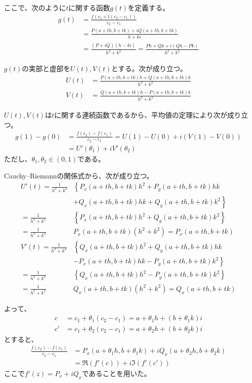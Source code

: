 ここで、次のように$t$に関する函数$g(t)$を定義する。
\begin{align*}
    g(t)&=\frac{f(c_1+t(c_2-c_1))}{c_2-c_1}\\
    &=\frac{P(a+th,b+tk)+iQ(a+th,b+tk)}{h+ki}\\
    &=\frac{(P+iQ)(h-ki)}{h^2+k^2}=\frac{Ph+Qk+i(Qh-Pk)}{h^2+k^2}
\end{align*}

$g(t)$の実部と虚部を$U(t),V(t)$とする。次が成り立つ。
\begin{align*}
    U(t)&=\frac{P(a+th,b+tk)h+Q(a+th,b+tk)k}{h^2+k^2}\\
    V(t)&=\frac{Q(a+th,b+tk)h-P(a+th,b+tk)k}{h^2+k^2}
\end{align*}

$U(t),V(t)$は$t$に関する連続函数であるから、平均値の定理により次が成り立つ。
\begin{align*}
    g(1)-g(0)&=\frac{f(c_2)-f(c_1)}{c_2-c_1}=U(1)-U(0)+i(V(1)-V(0))\\
    &=U'(\theta_1)+iV'(\theta_2)
\end{align*}
ただし、$\theta_1,\theta_2\in(0,1)$である。

Cauchy--Riemannの関係式から、次が成り立つ。
\begin{align*}
    U'(t)=\frac{1}{h^2+k^2}
    &\left\{P_x(a+th,b+tk)h^2+P_y(a+th,b+tk)hk\right.\\
    &\left.+Q_x(a+th,b+tk)hk+Q_y(a+th,b+tk)k^2\right\}\\
    =\frac{1}{h^2+k^2}
    &\left\{P_x(a+th,b+tk)h^2
    +Q_y(a+th,b+tk)k^2\right\}\\
    =\frac{1}{h^2+k^2}
    &P_x(a+th,b+tk)(h^2+k^2)=P_x(a+th,b+tk)\\
    V'(t)=\frac{1}{h^2+k^2}
    &\left\{Q_x(a+th,b+tk)h^2+Q_y(a+th,b+tk)hk\right.\\
    &\left.-P_x(a+th,b+tk)hk-P_y(a+th,b+tk)k^2\right\}\\
    =\frac{1}{h^2+k^2}
    &\left\{Q_x(a+th,b+tk)h^2
    -P_y(a+th,b+tk)k^2\right\}\\
    =\frac{1}{h^2+k^2}
    &Q_x(a+th,b+tk)(h^2+k^2)=Q_x(a+th,b+tk)
\end{align*}

よって、
\begin{align*}
    c&=c_1+\theta_1(c_2-c_1)=a+\theta_1 h+(b+\theta_1 k)i\\
    c'&=c_1+\theta_2(c_2-c_1)=a+\theta_2 h+(b+\theta_2 k)i
\end{align*}
とすると、
\begin{align*}
    \frac{f(c_2)-f(c_1)}{c_2-c_1}
    &=P_x(a+\theta_1 h,b+\theta_1 k)+iQ_x(a+\theta_2 h,b+\theta_2 k)\\
    &=\Re(f'(c))+i\Im(f'(c'))
\end{align*}
ここで$f'(z)=P_x+iQ_x$であることを用いた。

